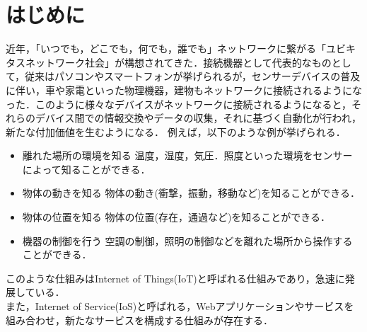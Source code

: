 \documentclass{kuisthesis}			%
\begin{document}
\section{はじめに}\label{sec-intro}		%
近年，「いつでも，どこでも，何でも，誰でも」ネットワークに繋がる「ユビキタスネットワーク社会」が構想されてきた．接続機器として代表的なものとして，従来はパソコンやスマートフォンが挙げられるが，センサーデバイスの普及に伴い，車や家電といった物理機器，建物もネットワークに接続されるようになった．このように様々なデバイスがネットワークに接続されるようになると，それらのデバイス間での情報交換やデータの収集，それに基づく自動化が行われ，新たな付加価値を生むようになる．
例えば，以下のような例が挙げられる．
\begin{itemize}
\item 離れた場所の環境を知る
温度，湿度，気圧．照度といった環境をセンサーによって知ることができる．
\item 物体の動きを知る
物体の動き(衝撃，振動，移動など)を知ることができる．
\item 物体の位置を知る
物体の位置(存在，通過など)を知ることができる．
\item 機器の制御を行う
空調の制御，照明の制御などを離れた場所から操作することができる．
\end{itemize}
このような仕組みはInternet of Things(IoT)と呼ばれる仕組みであり，急速に発展している．\cite{Atzori2010}\cite{Gubbi2013}\\
また，Internet of Service(IoS)と呼ばれる，Webアプリケーションやサービスを組み合わせ，新たなサービスを構成する仕組みが存在する．\cite{Vermesan2009}
\end{document}
